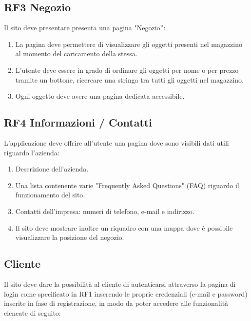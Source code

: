 \documentclass{report}
\begin{document}
\subsection*{RF3 Negozio}
Il sito deve presentare presenta una pagina "Negozio”: 

\begin{enumerate}
	\item La pagina deve permettere di visualizzare gli oggetti presenti nel magazzino al momento del caricamento della stessa.
	
	\item L’utente deve essere in grado di ordinare gli oggetti per nome o per prezzo tramite un bottone, ricercare una stringa tra tutti gli oggetti nel magazzino.
	
	\item Ogni oggetto deve avere una pagina dedicata accessibile.
\end{enumerate}


\subsection*{RF4 Informazioni / Contatti}
L’applicazione deve offrire all’utente una pagina dove sono visibili dati utili riguardo l'azienda:

\begin{enumerate}
	\item Descrizione dell'azienda.
	\item Una lista contenente varie "Frequently Asked Questions" (FAQ) riguardo il funzionamento del sito.
	\item Contatti dell’impresa: numeri di telefono, e-mail e indirizzo.
	\item Il sito deve mostrare inoltre un riquadro con una mappa dove è possibile visualizzare la posizione del negozio.
\end{enumerate}


\subsection{Cliente}
Il sito deve dare la possibilità al cliente di autenticarsi attraverso la pagina di login come specificato in RF1 inserendo le proprie credenziali (e-mail e password) inserite in fase di registrazione, in modo da poter accedere alle funzionalità elencate di seguito:
\end{document}
